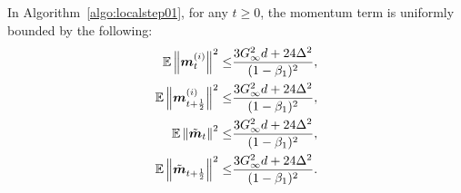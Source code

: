 \begin{lemma}
\label{lemma:local:momentum_bound}
In Algorithm~\ref{algo:localstep01}, for any $t\geq 0$, the momentum term is uniformly bounded by the following:
\begin{align*}
    \mathbb{E}\left\| \boldsymbol{m}_{t}^{(i)}\right\|^2 \leq & \frac{3G_\infty^2d+24\Delta^2}{(1-\beta_1)^2}, \\
    \mathbb{E}\left\| \boldsymbol{m}_{t+\frac{1}{2}}^{(i)}\right\|^2 \leq & \frac{3G_\infty^2d+24\Delta^2}{(1-\beta_1)^2}, \\
    \mathbb{E}\left\| \tilde{\boldsymbol{m}}_{t} \right\|^2 \leq & \frac{3G_\infty^2d+24\Delta^2}{(1-\beta_1)^2}, \\
    \mathbb{E}\left\| \tilde{\boldsymbol{m}}_{t+\frac{1}{2}} \right\|^2 \leq & \frac{3G_\infty^2d+24\Delta^2}{(1-\beta_1)^2}.
\end{align*}
\end{lemma}
